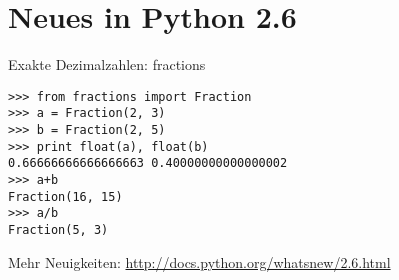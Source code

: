 \section{Neues in Python 2.6}

\begin{frame}[fragile]{Exakte Dezimalzahlen: fractions}

\begin{lstlisting}
>>> from fractions import Fraction
>>> a = Fraction(2, 3)
>>> b = Fraction(2, 5)
>>> print float(a), float(b)
0.66666666666666663 0.40000000000000002
>>> a+b
Fraction(16, 15)
>>> a/b
Fraction(5, 3)
\end{lstlisting}

Mehr Neuigkeiten: \href{http://docs.python.org/whatsnew/2.6.html}{http://docs.python.org/whatsnew/2.6.html}
\end{frame}

